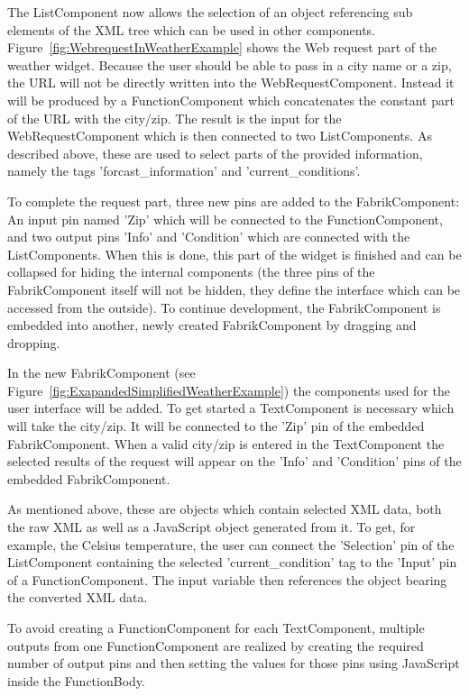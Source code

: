 \documentclass[pdftex, times, 10pt, twocolumn]{article}
\begin{document}
The ListComponent now allows the selection of an object referencing sub elements of the XML tree which can be used in other components. Figure~\ref{fig:WebrequestInWeatherExample} shows the Web request part of the weather widget. Because the user should be able to pass in a city name or a zip, the URL will not be directly written into the WebRequestComponent. Instead it will be produced by a FunctionComponent which concatenates the constant part of the URL with the city/zip. The result is the input for the WebRequestComponent which is then connected to two ListComponents. As described above, these are used to select parts of the provided information, namely the tags 'forcast\_information' and 'current\_conditions'. 

To complete the request part, three new pins are added to the FabrikComponent: An input pin named 'Zip' which will be connected to the FunctionComponent, and two output pins 'Info' and 'Condition' which are connected with the ListComponents. When this is done, this part of the widget is finished and can be collapsed for hiding the internal components (the three pins of the FabrikComponent itself will not be hidden, they define the interface which can be accessed from the outside). To continue development, the FabrikComponent is embedded into another, newly created FabrikComponent by dragging and dropping. 

In the new FabrikComponent (see Figure~\ref{fig:ExapandedSimplifiedWeatherExample}) the components used for the user interface will be added. To get started a TextComponent is necessary which will take the city/zip. It will be connected to the 'Zip' pin of the embedded FabrikComponent. When a valid city/zip is entered in the TextComponent the selected results of the request will appear on the 'Info' and 'Condition' pins of the embedded FabrikComponent. 

As mentioned above, these are objects which contain selected XML data, both the raw XML as well as a JavaScript object generated from it. To get, for example, the Celsius temperature, the user can connect the 'Selection' pin of the ListComponent containing the selected 'current\_condition' tag to the 'Input' pin of a FunctionComponent. The input variable then references the object bearing the converted XML data.  

To avoid creating a FunctionComponent for each TextComponent, multiple outputs from one FunctionComponent are realized by creating the required number of output pins and then setting the values for those  pins using JavaScript inside the FunctionBody. 
\end{document}
